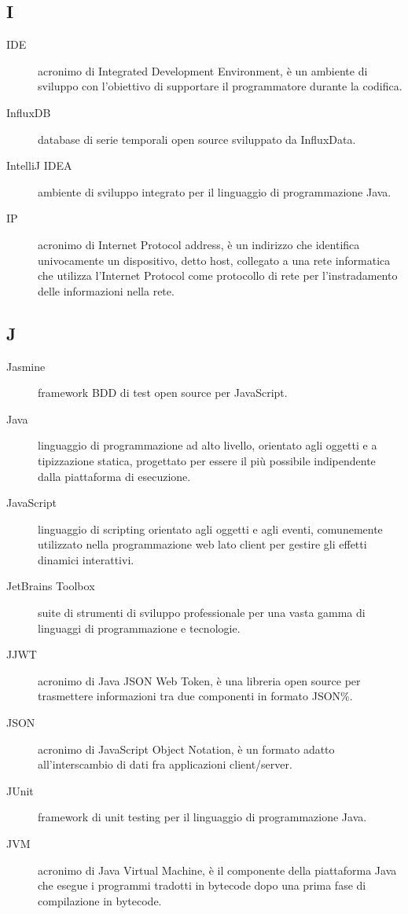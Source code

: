 \documentclass[../manuale-manutentore.tex]{subfiles}
\begin{document}
\subsection{I}

\begin{description}
    \item[IDE] acronimo di Integrated Development Environment, è un ambiente di sviluppo con l'obiettivo di supportare il programmatore durante la codifica.
    \item[InfluxDB] database di serie temporali open source sviluppato da InfluxData.
    \item[IntelliJ IDEA] ambiente di sviluppo integrato per il linguaggio di programmazione Java.
    \item[IP] acronimo di Internet Protocol address, è un indirizzo che identifica univocamente un dispositivo, detto host, collegato a una rete informatica che utilizza l'Internet Protocol come protocollo di rete per l'instradamento delle informazioni nella rete.
\end{description}

\subsection{J}

\begin{description}
    \item[Jasmine] framework BDD di test open source per JavaScript.
    \item[Java] linguaggio di programmazione ad alto livello, orientato agli oggetti e a tipizzazione statica, progettato per essere il più possibile indipendente dalla piattaforma di esecuzione.
    \item[JavaScript] linguaggio di scripting orientato agli oggetti e agli eventi, comunemente utilizzato nella programmazione web lato client per gestire gli effetti dinamici interattivi.
    \item[JetBrains Toolbox] suite di strumenti di sviluppo professionale per una vasta gamma di linguaggi di programmazione e tecnologie.
    \item[JJWT] acronimo di Java JSON Web Token, è una libreria open source per trasmettere informazioni tra due componenti in formato JSON\%.
    \item[JSON] acronimo di JavaScript Object Notation, è un formato adatto all'interscambio di dati fra applicazioni client/server.
    \item[JUnit] framework di unit testing per il linguaggio di programmazione Java.
    \item[JVM] acronimo di Java Virtual Machine, è il componente della piattaforma Java che esegue i programmi tradotti in bytecode dopo una prima fase di compilazione in bytecode.
\end{description}
\end{document}
